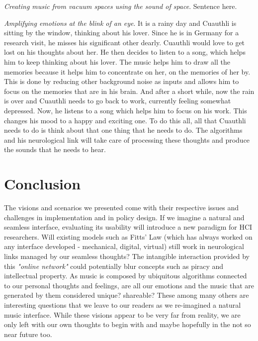 \documentclass[sigchi]{acmart}
\begin{document}
\textit{Creating music from vacuum spaces using the sound of space}. Sentence here. 

\textit{Amplifying emotions at the blink of an eye}. It is a rainy day and Cuauthli is sitting by the window, thinking about his lover. Since he is in Germany for a research visit, he misses his significant other dearly. Cuauthli would love to get lost on his thoughts about her. He then decides to listen to a song, which helps him to keep thinking about his lover. The music helps him to draw all the memories because it helps him to concentrate on her, on the memories of her by. This is done by reducing other background noise as inputs and allows him to focus on the memories that are in his brain. And after a short while, now the rain is over and Cuauthli needs to go back to work, currently feeling somewhat depressed. Now, he listens to a song which helps him to focus on his work. This changes his mood to a happy and exciting one. To do this all, all that Cuauthli needs to do is think about that one thing that he needs to do. The algorithms and his neurological link will take care of processing these thoughts and produce the sounds that he needs to hear. 

\section{Conclusion}
The visions and scenarios we presented come with their respective issues and challenges in implementation and in policy design. If we imagine a natural and seamless interface, evaluating its usability will introduce a new paradigm for HCI researchers. Will existing models such as Fitts' Law (which has always worked on any interface developed - mechanical, digital, virtual) still work in neurological links managed by our seamless thoughts? The intangible interaction provided by this \textit{"online network"} could potentially blur concepts such as piracy and intellectual property. As music is composed by ubiquitous algorithms connected to our personal thoughts and feelings, are all our emotions and the music that are generated by them considered unique? shareable? These among many others are interesting questions that we leave to our readers as we re-imagined a natural music interface. While these visions appear to be very far from reality, we are only left with our own thoughts to begin with and maybe hopefully in the not so near future too. 





\end{document}
